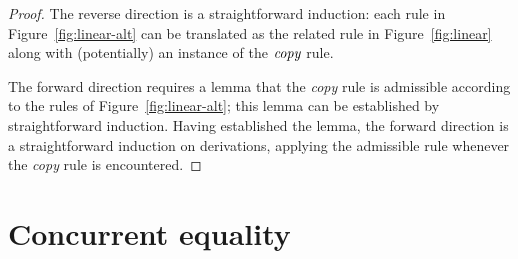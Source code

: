\begin{proof}
The reverse direction is a straightforward induction: each rule in 
Figure~\ref{fig:linear-alt} can be translated as the related rule
in Figure~\ref{fig:linear} along with (potentially) an instance of 
the ${\it copy}$ rule.

The forward direction requires a lemma that the {\it copy} rule is
admissible according to the rules of Figure~\ref{fig:linear-alt}; this
lemma can be established by straightforward induction. Having
established the lemma, the forward direction is a straightforward
induction on derivations, applying the admissible rule whenever the 
{\it copy} rule is encountered.
\end{proof}




\section{Concurrent equality}
\label{sec:linconcurrenteq}

